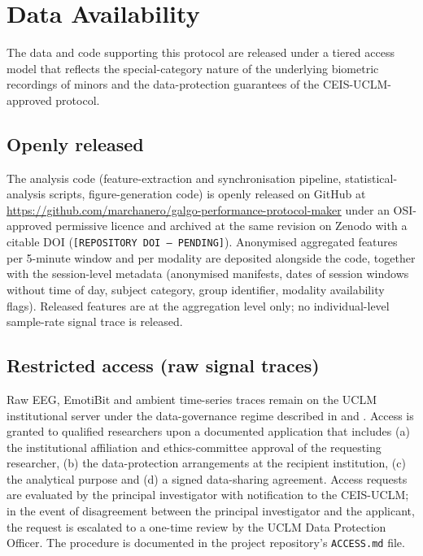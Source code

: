 
\section*{Data Availability}\label{sec:data-availability}

The data and code supporting this protocol are released under a tiered access model that reflects the special-category nature of the underlying biometric recordings of minors and the data-protection guarantees of the CEIS-UCLM-approved protocol.

\subsection*{Openly released}

The analysis code (feature-extraction and synchronisation pipeline, statistical-analysis scripts, figure-generation code) is openly released on GitHub at \url{https://github.com/marchanero/galgo-performance-protocol-maker} under an OSI-approved permissive licence and archived at the same revision on Zenodo with a citable DOI (\texttt{[REPOSITORY DOI --- PENDING]}). Anonymised aggregated features per 5-minute window and per modality are deposited alongside the code, together with the session-level metadata (anonymised manifests, dates of session windows without time of day, subject category, group identifier, modality availability flags). Released features are at the aggregation level only; no individual-level sample-rate signal trace is released.

\subsection*{Restricted access (raw signal traces)}

Raw EEG, EmotiBit and ambient time-series traces remain on the UCLM institutional server under the data-governance regime described in  and . Access is granted to qualified researchers upon a documented application that includes (a) the institutional affiliation and ethics-committee approval of the requesting researcher, (b) the data-protection arrangements at the recipient institution, (c) the analytical purpose and (d) a signed data-sharing agreement. Access requests are evaluated by the principal investigator with notification to the CEIS-UCLM; in the event of disagreement between the principal investigator and the applicant, the request is escalated to a one-time review by the UCLM Data Protection Officer. The procedure is documented in the project repository's \texttt{ACCESS.md} file.

